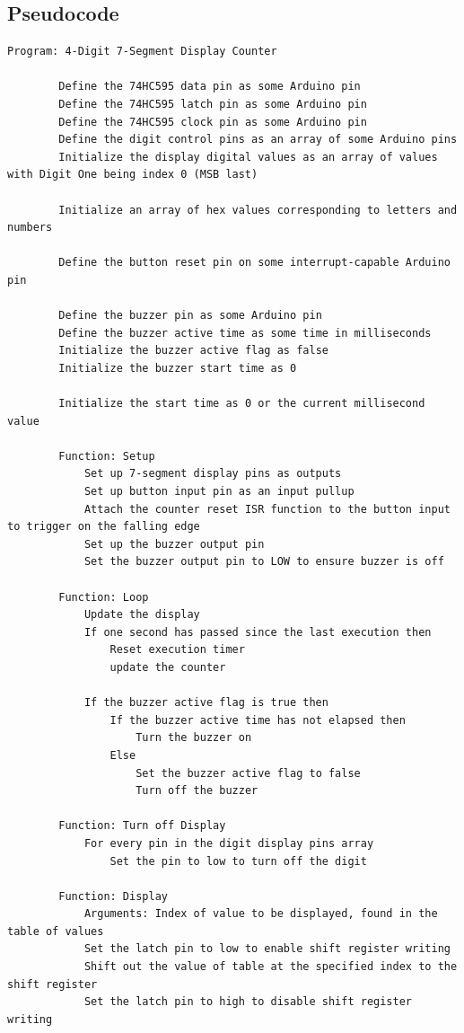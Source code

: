     \subsection*{Pseudocode}
    \begin{lstlisting}[linewidth=1.5\textwidth]
        Program: 4-Digit 7-Segment Display Counter

        Define the 74HC595 data pin as some Arduino pin
        Define the 74HC595 latch pin as some Arduino pin
        Define the 74HC595 clock pin as some Arduino pin
        Define the digit control pins as an array of some Arduino pins
        Initialize the display digital values as an array of values with Digit One being index 0 (MSB last)

        Initialize an array of hex values corresponding to letters and numbers

        Define the button reset pin on some interrupt-capable Arduino pin
        
        Define the buzzer pin as some Arduino pin
        Define the buzzer active time as some time in milliseconds
        Initialize the buzzer active flag as false
        Initialize the buzzer start time as 0

        Initialize the start time as 0 or the current millisecond value

        Function: Setup
            Set up 7-segment display pins as outputs
            Set up button input pin as an input pullup
            Attach the counter reset ISR function to the button input to trigger on the falling edge
            Set up the buzzer output pin
            Set the buzzer output pin to LOW to ensure buzzer is off

        Function: Loop
            Update the display
            If one second has passed since the last execution then
                Reset execution timer
                update the counter
            
            If the buzzer active flag is true then
                If the buzzer active time has not elapsed then
                    Turn the buzzer on
                Else
                    Set the buzzer active flag to false
                    Turn off the buzzer

        Function: Turn off Display
            For every pin in the digit display pins array
                Set the pin to low to turn off the digit
        
        Function: Display
            Arguments: Index of value to be displayed, found in the table of values
            Set the latch pin to low to enable shift register writing
            Shift out the value of table at the specified index to the shift register
            Set the latch pin to high to disable shift register writing


\end{lstlisting}
